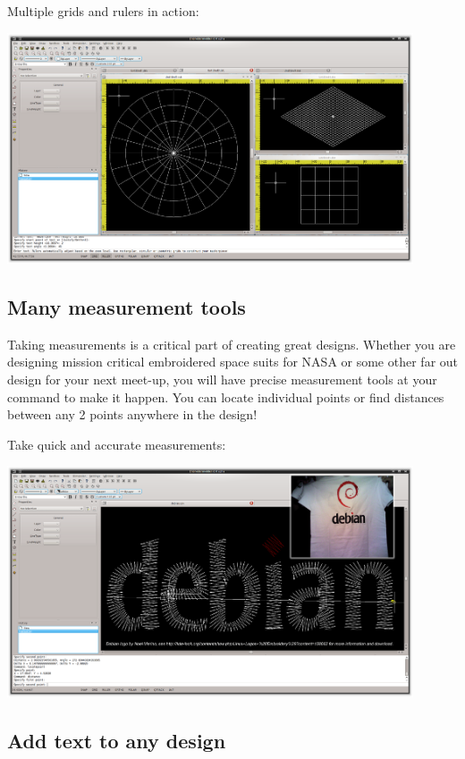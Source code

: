 \documentclass[a4paper, 11pt]{report}
\begin{document}
Multiple grids and rulers in action:

\includegraphics[width=0.9\textwidth]{images/features-grid-ruler-1.png}

\subsection{Many measurement tools}

Taking measurements is a critical part of creating great designs. Whether you are designing mission critical embroidered space suits for NASA or some other far out design for your next meet-up, you will have precise measurement tools at your command to make it happen. You can locate individual points or find distances between any 2 points anywhere in the design!

Take quick and accurate measurements:

\includegraphics[width=0.9\textwidth]{images/features-measure-1.png}

\subsection{Add text to any design}
\end{document}
